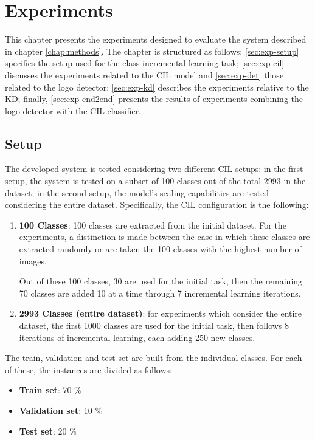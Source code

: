 \chapter{Experiments}
\label{chap:experiments}
This chapter presents the experiments designed to evaluate the system described in chapter \autoref{chap:methods}.
The chapter is structured as follows: \autoref{sec:exp-setup} specifies the setup used for the class incremental learning task; \autoref{sec:exp-cil} discusses the experiments related to the CIL model and \autoref{sec:exp-det} those related to the logo detector; \autoref{sec:exp-kd} describes the experiments relative to the KD; finally, \autoref{sec:exp-end2end} presents the results of experiments combining the logo detector with the CIL classifier.

\section{Setup}
\label{sec:exp-setup}
The developed system is tested considering two different CIL setups: in the first setup, the system is tested on a subset of 100 classes out of the total 2993 in the dataset; in the second setup, the model's scaling capabilities are tested considering the entire dataset. Specifically, the CIL configuration is the following:
\begin{enumerate}
    \item \textbf{100 Classes}: 100 classes are extracted from the initial dataset. For the experiments, a distinction is made between the case in which these classes are extracted randomly or are taken the 100 classes with the highest number of images.
    
    Out of these 100 classes, 30 are used for the initial task, then the remaining 70 classes are added 10 at a time through 7 incremental learning iterations.

    \item \textbf{2993 Classes (entire dataset)}: for experiments which consider the entire dataset, the first 1000 classes are used for the initial task, then follows 8 iterations of incremental learning, each adding 250 new classes.
\end{enumerate}

The train, validation and test set are built from the individual classes. For each of these, the instances are divided as follows:
\begin{itemize}
    \item \textbf{Train set}: 70 \%
    \item \textbf{Validation set}: 10 \%
    \item \textbf{Test set}: 20 \%
\end{itemize}


